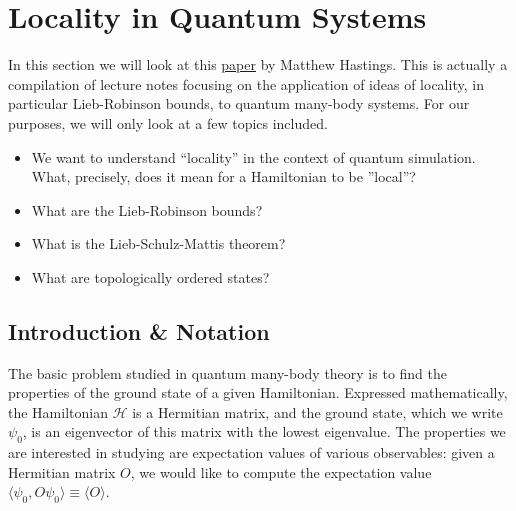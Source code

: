 \documentclass{book}
\theoremstyle{definition}
\newcommand{\had}{\mathcal{H}}
\begin{document}
\newpage




\section{Locality in Quantum Systems}

In this section we will look at this \href{https://arxiv.org/pdf/1008.5137.pdf}{\underline{paper}} by Matthew Hastings. This is actually a compilation of lecture notes focusing on the application of ideas of locality, in particular Lieb-Robinson bounds, to quantum many-body systems. For our purposes, we will only look at a few topics included. 
\begin{itemize}
	\item We want to understand ``locality'' in the context of quantum simulation. What, precisely, does it mean for a Hamiltonian to be ''local''? 
	
	\item What are the Lieb-Robinson bounds? 
	
	\item What is the Lieb-Schulz-Mattis theorem?
	
	\item What are topologically ordered states? 
\end{itemize}





\subsection{Introduction \& Notation}

The basic problem studied in quantum many-body theory is to find the properties of the ground state of a given
Hamiltonian. Expressed mathematically, the Hamiltonian $\had$ is a Hermitian matrix, and the ground state, which we write $\psi_0$, is an eigenvector of this matrix with the lowest eigenvalue.  The properties we are interested in studying
are expectation values of various observables: given a Hermitian matrix $O$, we would like to compute the expectation value $\langle \psi_0 , O \psi_0\rangle \equiv \langle O \rangle$. \\
\end{document}
